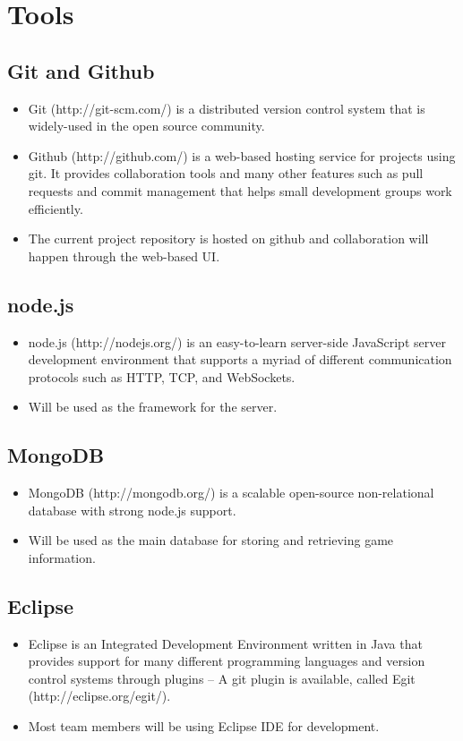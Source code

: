 \documentclass[letterpaper,12pt]{article}
\begin{document}
\section{Tools}
\subsection{Git and Github}
	\begin{itemize}
		\item Git (http://git-scm.com/) is a distributed version control system that is widely-used in the open source community.
		\item Github (http://github.com/) is a web-based hosting service for projects using git. It provides collaboration tools and many other features such as pull requests and commit management that helps small development groups work efficiently.
		\item The current project repository is hosted on github and collaboration will happen through the web-based UI.
	\end{itemize}
\subsection{node.js}
	\begin{itemize}
		\item node.js (http://nodejs.org/) is an easy-to-learn server-side JavaScript server development environment that supports a myriad of different communication protocols such as HTTP, TCP, and WebSockets.
		\item Will be used as the framework for the server.
	\end{itemize}
\subsection{MongoDB}
	\begin{itemize}
		\item MongoDB (http://mongodb.org/) is a scalable open-source non-relational database with strong node.js support.
		\item Will be used as the main database for storing and retrieving game information.
	\end{itemize}
\subsection{Eclipse}
	\begin{itemize}
		\item Eclipse is an Integrated Development Environment written in Java that provides support for many different programming languages and version control systems through plugins -- A git plugin is available, called Egit (http://eclipse.org/egit/).
		\item Most team members will be using Eclipse IDE for development.
	\end{itemize}
\end{document}
